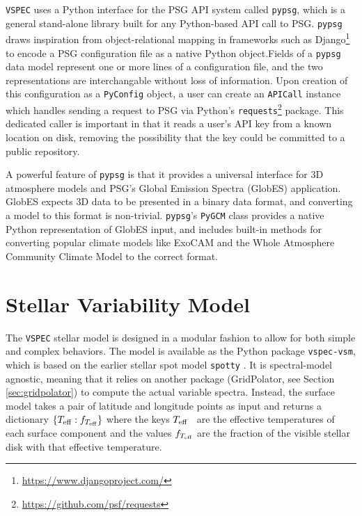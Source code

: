 \documentclass[twocolumn]{aastex631}
\newcommand{\teff}{$T_{\rm eff}$}
\newcommand{\vspec}[1]{\texttt{VSPEC}#1}
\begin{document}
\vspec{} uses a Python interface for the PSG API system called \texttt{pypsg}, which is a general stand-alone library built for any Python-based API call to PSG. \texttt{pypsg} draws inspiration from object-relational mapping in frameworks such as Django\footnote{\url{https://www.djangoproject.com/}} to encode a PSG configuration file as a native Python object.Fields of a \texttt{pypsg} data model represent one or more lines of a configuration file, and the two representations are interchangable without loss of information. Upon creation of this configuration as a \texttt{PyConfig} object, a user can create an \texttt{APICall} instance which handles sending a request to PSG via Python's \texttt{requests}\footnote{\url{https://github.com/psf/requests}} package. This dedicated caller is important in that it reads a user's API key from a known location on disk, removing the possibility that the key
could be committed to a public repository.

A powerful feature of \texttt{pypsg} is that it provides a universal interface for 3D atmosphere models and PSG's Global Emission Spectra (GlobES) application.
GlobES expects 3D data to be presented in a binary data format, and converting a model to this format is non-trivial. \texttt{pypsg}'s \texttt{PyGCM} class provides a native Python representation of GlobES input, and includes built-in methods for converting popular climate models like ExoCAM \citep{wolf2022} and the Whole Atmosphere Community Climate Model \citep[WACCM,][]{marsh2013} to the correct format.

\section{Stellar Variability Model}
\label{sec:star}

The \vspec{} stellar model is designed in a modular fashion to allow for both simple and complex behaviors. The model is available as the Python package \texttt{vspec-vsm}, which is based on the earlier stellar spot model \texttt{spotty} \citep{barclay2021}. It is spectral-model agnostic, meaning that it relies on another package (GridPolator, see Section \ref{sec:gridpolator}) to compute the actual variable spectra. Instead, the surface model takes a pair of latitude and longitude points as input and returns a dictionary $\{ T_{\rm eff} : f_{T_{\rm eff}} \}$ where the keys \teff~ are the effective temperatures of each surface component and the values $f_{T_{\rm eff}}$ are the fraction of the visible stellar disk with that effective temperature.
\end{document}
